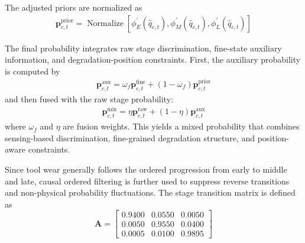 \documentclass[a4paper,fleqn]{cas-sc}
\begin{document}
  The adjusted priors are normalized as
  \begin{equation}
    \begin{aligned}
      \mathbf{p}_{c,t}^{\mathrm{prior}}
      =
      \operatorname{Normalize}\!\left[
      \phi_{E}^{'}(\hat{q}_{c,t}),
      \phi_{M}^{'}(\hat{q}_{c,t}),
      \phi_{L}^{'}(\hat{q}_{c,t})
      \right]
    \end{aligned}
  \end{equation}
  
  The final probability integrates raw stage discrimination, fine-state auxiliary information, and degradation-position constraints. First, the auxiliary probability is computed by
  \begin{equation}
    \begin{aligned}
      \mathbf{p}_{c,t}^{\mathrm{aux}}=\omega_{f}\mathbf{p}_{c,t}^{\mathrm{fine}}+(1-\omega_{f})\mathbf{p}_{c,t}^{\mathrm{prior}}
    \end{aligned}
  \end{equation}
  and then fused with the raw stage probability:
  \begin{equation}
    \begin{aligned}
      \mathbf{p}_{c,t}^{\mathrm{mix}}=\eta\mathbf{p}_{c,t}^{\mathrm{raw}}+(1-\eta)\mathbf{p}_{c,t}^{\mathrm{aux}}
    \end{aligned}
  \end{equation}
  where $\omega_{f}$ and $\eta$ are fusion weights. This yields a mixed probability that combines sensing-based discrimination, fine-grained degradation structure, and position-aware constraints.

  Since tool wear generally follows the ordered progression from early to middle and late, causal ordered filtering is further used to suppress reverse transitions and non-physical probability fluctuations. The stage transition matrix is defined as
  \begin{equation}
	\mathbf{A}=
	\begin{bmatrix}
		0.9400 & 0.0550 & 0.0050\\
		0.0050 & 0.9550 & 0.0400\\
		0.0005 & 0.0100 & 0.9895
	\end{bmatrix}
	\label{eq:transition_matrix}
  \end{equation}
  
\end{document}
